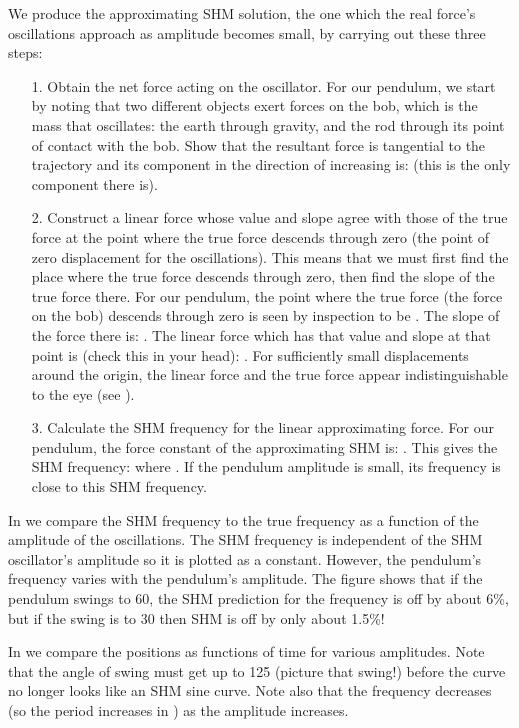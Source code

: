 {
We produce the approximating SHM solution, the one which the real force's
oscillations approach as amplitude becomes small, by carrying out these three
steps:
\begin{itemize}
\item[1.] Obtain the net force acting on the oscillator.
For our pendulum, we start by noting that two different objects
exert forces on the bob, which is the mass that oscillates: the earth through
gravity, and the rod through its point of contact with the bob.
Show that the resultant force is tangential to the trajectory and its
component in the direction of increasing  is: 
(this is the only component there is). \,
%
%
\item[2.] Construct a linear force whose value and slope agree with those of
the true force at the point where the true force descends through zero (the
point of zero displacement for the oscillations).
This means that we must first find the place where the true force descends
through zero, then find the slope of the true force there.
For our pendulum, the point where the true force (the force on the bob)
descends through zero is seen by inspection to be .
The slope of the force there is: .
The linear force which has that value and slope at that point is (check this
in your head): .
For sufficiently small displacements around the origin, the linear force and 
the true force appear indistinguishable to the eye (see ).
\item[3.] Calculate the SHM frequency for the linear approximating force.
For our pendulum, the force constant of the approximating SHM is:
.
This gives the SHM frequency:
 where .
If the pendulum amplitude is small, its frequency is close to this SHM
frequency.
\end{itemize}


In  we compare the SHM frequency to the true frequency as a function
of the amplitude of the oscillations.
The SHM frequency is independent of the SHM oscillator's amplitude so it is
plotted as a constant.
However, the pendulum's frequency varies with the pendulum's amplitude.
The figure shows that if the pendulum swings to {60\degrees}, the SHM prediction
for the frequency is off by about 6\%, but if the swing is to {30\degrees}
then SHM is off by only about 1.5\%!
%

In  we compare the positions as functions of time for various
amplitudes.
Note that the angle of swing must get up to {125\degrees} (picture that
swing!) before the curve no longer looks like an SHM sine
curve.
Note also that the frequency decreases (so the period increases in )
as the amplitude increases.
}%
